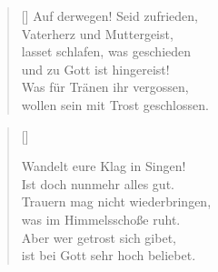 \begin{multicols}{2}
\begin{verse}[\versewidth]
 Auf derwegen! Seid zufrieden,\\
Vaterherz und Muttergeist,\\
lasset schlafen, was geschieden\\
und zu Gott ist hingereist!\\
Was für Tränen ihr vergossen,\\
wollen sein mit Trost geschlossen.
\end{verse}
\end{multicols}

\begin{center}
\settowidth{\versewidth}{Der, vor dem die Welt erschrickt,}
\begin{verse}[\versewidth]


 Wandelt eure Klag in Singen!\\
Ist doch nunmehr alles gut.\\
Trauern mag nicht wiederbringen,\\
was im Himmelsschoße ruht.\\
Aber wer getrost sich gibet,\\
ist bei Gott sehr hoch beliebet.
\end{verse}
\end{center}


